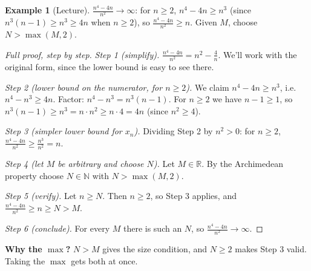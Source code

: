 \documentclass[11pt]{article}
\theoremstyle{definition}
\newtheorem{ex}[defn]{Example}
\newcommand{\N}{\mathbb{N}}
\newcommand{\R}{\mathbb{R}}
\newcommand{\key}[1]{\textcolor{red!70!black}{\textbf{#1}}}
\begin{document}
\begin{ex}[Lecture]
$\frac{n^4-4n}{n^2}\to\infty$: for $n\ge2$, $n^4-4n\ge n^3$ (since
$n^3(n-1)\ge n^3\ge 4n$ when $n\ge 2$), so $\frac{n^4-4n}{n^2}\ge n$. Given
$M$, choose $N>\max(M,2)$.

\begin{proof}[Full proof, step by step]
\emph{Step 1 (simplify).} $\frac{n^4-4n}{n^2}=n^2-\frac4n$. We'll work with
the original form, since the lower bound is easy to see there.

\emph{Step 2 (lower bound on the numerator, for $n\ge2$).} We claim
$n^4-4n\ge n^3$, i.e.\ $n^4-n^3\ge4n$. Factor:
$n^4-n^3=n^3(n-1)$. For $n\ge2$ we have $n-1\ge1$, so
$n^3(n-1)\ge n^3=n\cdot n^2\ge n\cdot4=4n$ (since $n^2\ge4$).

\emph{Step 3 (simpler lower bound for $x_n$).} Dividing Step 2 by
$n^2>0$: for $n\ge2$, $\frac{n^4-4n}{n^2}\ge\frac{n^3}{n^2}=n$.

\emph{Step 4 (let $M$ be arbitrary and choose $N$).} Let $M\in\R$. By the
Archimedean property choose $N\in\N$ with $N>\max(M,2)$.

\emph{Step 5 (verify).} Let $n\ge N$. Then $n\ge2$, so Step 3 applies, and
$\frac{n^4-4n}{n^2}\ge n\ge N>M$.

\emph{Step 6 (conclude).} For every $M$ there is such an $N$, so
$\frac{n^4-4n}{n^2}\to\infty$.
\end{proof}
\noindent\key{Why the $\max$?} $N>M$ gives the size condition, and $N\ge2$
makes Step 3 valid. Taking the $\max$ gets both at once.
\end{ex}
\end{document}
